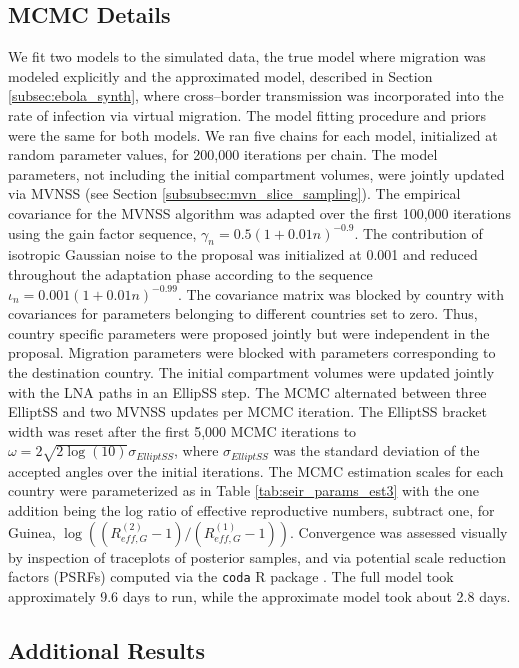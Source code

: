 \newpage
\subsection{MCMC Details}
\label{subsec:ebola_synth_mcmc}
We fit two models to the simulated data, the true model where migration was modeled explicitly and the approximated model, described in Section \ref{subsec:ebola_synth}, where cross--border transmission was incorporated into the rate of infection via virtual migration. The model fitting procedure and priors were the same for both models. We ran five chains for each model, initialized at random parameter values, for 200,000 iterations per chain. The model parameters, not including the initial compartment volumes, were jointly updated via MVNSS (see Section \ref{subsubsec:mvn_slice_sampling}). The empirical covariance for the MVNSS algorithm was adapted over the first 100,000 iterations using the gain factor sequence, $\gamma_n = 0.5(1 + 0.01n)^{-0.9}$. The contribution of isotropic Gaussian noise to the proposal was initialized at 0.001 and reduced throughout the adaptation phase according to the sequence $ \iota_n = 0.001(1 + 0.01n)^{-0.99} $. The covariance matrix was blocked by country with covariances for parameters belonging to different countries set to zero. Thus, country specific parameters were proposed jointly but were independent in the proposal. Migration parameters were blocked with parameters corresponding to the destination country. The initial compartment volumes were updated jointly with the LNA paths in an EllipSS step. The MCMC alternated between three ElliptSS and two MVNSS updates per MCMC iteration. The ElliptSS bracket width was reset after the first 5,000 MCMC iterations to $ \omega = 2\sqrt{2\log(10)}\sigma_{ElliptSS}$, where $ \sigma_{ElliptSS} $ was the standard deviation of the accepted angles over the initial iterations. The MCMC estimation scales for each country were parameterized as in Table \ref{tab:seir_params_est3} with the one addition being the log ratio of effective reproductive numbers, subtract one, for Guinea, $ \log\left ((R_{eff,G}^{(2)}-1)/(R_{eff,G}^{(1)}-1)\right ) $. Convergence was assessed visually by inspection of traceplots of posterior samples, and via potential scale reduction factors (PSRFs) \cite{brooks1998general} computed via the \texttt{coda} R package \cite{codapackage}. The full model took approximately 9.6 days to run, while the approximate model took about 2.8 days. 

\subsection{Additional Results}
\label{subsec:ebola_synth_supplement}

